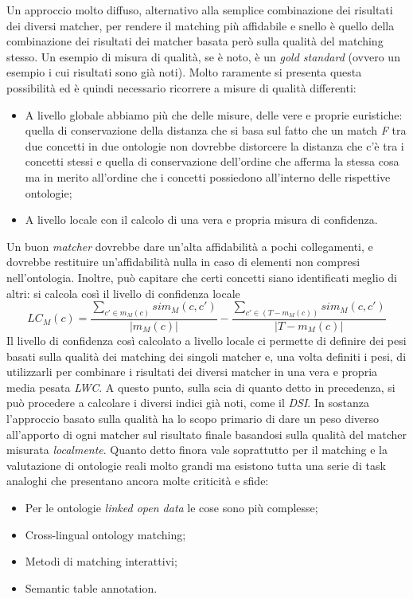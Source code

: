 \documentclass[11pt]{article}
\begin{document}
Un approccio molto diffuso, alternativo alla semplice combinazione dei risultati dei diversi matcher, per rendere il matching più affidabile e snello è quello della combinazione dei risultati dei matcher basata però sulla qualità del matching stesso. Un esempio di misura di qualità, se è noto, è un \textit{gold standard} (ovvero un esempio i cui risultati sono già noti). Molto raramente si presenta questa possibilità ed è quindi necessario ricorrere a misure di qualità differenti:
\begin{itemize}
\item A livello globale abbiamo più che delle misure, delle vere e proprie euristiche: quella di conservazione della distanza che si basa sul fatto che un match \textit{F} tra due concetti in due ontologie non dovrebbe distorcere la distanza che c'è tra i concetti stessi e quella di conservazione dell'ordine che afferma la stessa cosa ma in merito all'ordine che i concetti possiedono all'interno delle rispettive ontologie;
\item A livello locale con il calcolo di una vera e propria misura di confidenza.
\end{itemize}
Un buon \textit{matcher} dovrebbe dare un'alta affidabilità a pochi collegamenti, e dovrebbe restituire un'affidabilità nulla in caso di elementi non compresi nell'ontologia.
Inoltre, può capitare che certi concetti siano identificati meglio di altri: si calcola così il livello di confidenza locale
\begin{equation*}
  LC_M(c) = \frac{\sum_{c' \in m_M(c)}sim_M(c, c')}{|m_M(c)|} - \frac{\sum_{c' \in (T - m_M(c))}sim_M(c, c')}{|T - m_M(c)|}
\end{equation*}
Il livello di confidenza così calcolato a livello locale ci permette di definire dei pesi basati sulla qualità dei matching dei singoli matcher e, una volta definiti i pesi, di utilizzarli per combinare i risultati dei diversi matcher in una vera e propria media pesata \textit{LWC}. A questo punto, sulla scia di quanto detto in precedenza, si può procedere a calcolare i diversi indici già noti, come il \textit{DSI}. In sostanza l'approccio basato sulla qualità ha lo scopo primario di dare un peso diverso all'apporto di ogni matcher sul risultato finale basandosi sulla qualità del matcher misurata \textit{localmente}.
\newline
\newline
Quanto detto finora vale soprattutto per il matching e la valutazione di ontologie reali molto grandi ma esistono tutta una serie di task analoghi che presentano ancora molte criticità e sfide:
\begin{itemize}
\item Per le ontologie \textit{linked open data} le cose sono più complesse;
\item Cross-lingual ontology matching;
\item Metodi di matching interattivi;
\item Semantic table annotation.
\end{itemize} 
\newpage
\end{document}
